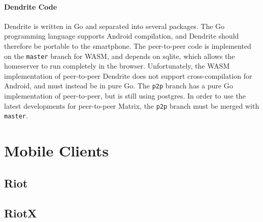 \paragraph{Dendrite Code}
Dendrite is written in Go\cite{golang_org} and separated into several packages.
The Go programming language supports Android compilation, and Dendrite should therefore be portable to the smartphone.
The peer-to-peer code is implemented on the \texttt{master} branch for WASM, and depends on sqlite, which allows the homeserver to run completely in the browser.
Unfortunately, the WASM implementation of peer-to-peer Dendrite does not support cross-compilation for Android, and must instead be in pure Go.
The \texttt{p2p} branch has a pure Go implementation of peer-to-peer, but is still using postgres.
In order to use the latest developments for peer-to-peer Matrix, the \texttt{p2p} branch must be merged with \texttt{master}.

\section{Mobile Clients}
\subsection{Riot}
\subsection{RiotX}


